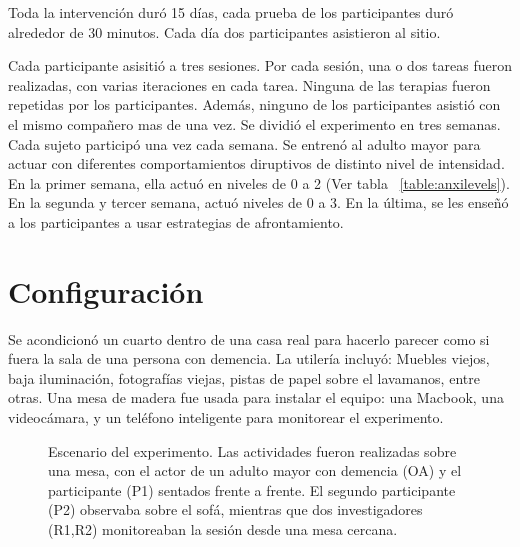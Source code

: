 Toda la intervenci\'on dur\'o 15 d\'ias, cada prueba de los participantes dur\'o alrededor de 30 minutos. Cada d\'ia dos participantes asistieron al sitio.

Cada participante asisiti\'o a tres sesiones. Por cada sesi\'on, una o dos tareas fueron realizadas, con varias iteraciones en cada tarea. Ninguna de las terapias fueron repetidas por los participantes. Adem\'as, ninguno de los participantes asisti\'o con el mismo compa\~nero mas de una vez. Se dividi\'o el experimento en tres semanas. Cada sujeto particip\'o una vez cada semana. Se entren\'o al adulto mayor para actuar con diferentes comportamientos diruptivos de distinto nivel de intensidad. En la primer semana, ella actu\'o en niveles de 0 a 2 (Ver tabla ~\ref{table:anxilevels}). En la segunda y tercer semana, actu\'o niveles de 0 a 3. En la \'ultima, se les ense\~n\'o a los participantes a usar estrategias de afrontamiento.
\section{Configuraci\'on}\label{secc:setup}
	Se acondicion\'o un cuarto dentro de una casa real para hacerlo parecer como si fuera la sala de una persona con demencia. La utiler\'ia incluy\'o: Muebles viejos, baja iluminaci\'on, fotograf\'ias viejas, pistas de papel sobre el lavamanos, entre otras. Una mesa de madera fue usada para instalar el equipo: una Macbook, una videoc\'amara, y un tel\'efono inteligente para monitorear el experimento.
\begin{figure}[h!]
        \centering
	\caption{Escenario del experimento. Las actividades fueron realizadas sobre una mesa, con el actor de un adulto mayor con demencia (OA) y el participante (P1) sentados frente a frente. El segundo participante (P2) observaba sobre el sof\'a, mientras que dos investigadores (R1,R2) monitoreaban la sesi\'on desde una mesa cercana.} \label{fig:img_exp_setup}
\end{figure}

